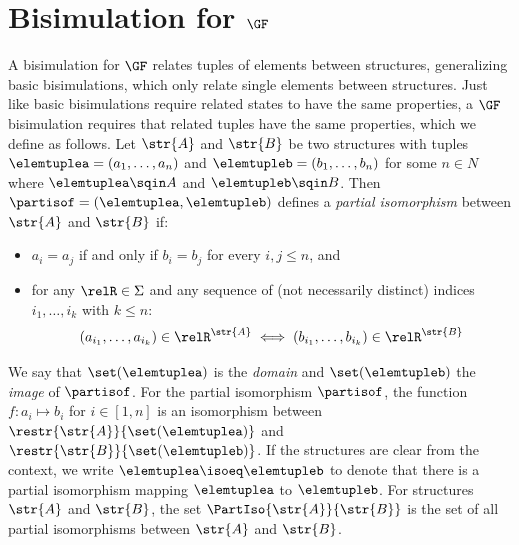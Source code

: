 \section{Bisimulation for $\GF$}
A bisimulation for $\GF$ relates tuples of elements between structures, generalizing basic bisimulations, which only relate single elements between structures.
Just like basic bisimulations require related states to have the same properties, a $\GF$ bisimulation requires that related tuples have the same properties, which we define as follows.
Let $\str{A}$ and $\str{B}$ be two structures with tuples $\elemtuplea = (a_{1}, \ldots, a_{n})$ and $\elemtupleb = (b_{1}, \ldots, b_{n})$ for some $n \in N$ where $\elemtuplea \sqin A$ and $\elemtupleb \sqin B$.
Then $\partisof = (\elemtuplea, \elemtupleb)$ defines a \emph{partial isomorphism} between $\str{A}$ and $\str{B}$ if:
\begin{itemize}
  \item $a_{i} = a_{j}$ if and only if $b_{i} = b_{j}$ for every $i,j \le n$, and
  \item for any $\relR \in \Sigma$ and any sequence of (not necessarily distinct) indices $i_{1}, \ldots, i_{k}$ with $k \le n$:
    \begin{equation*}
    (a_{i_{1}}, \ldots, a_{i_{k}}) \in \relR^{\str{A}} \iff (b_{i_{1}}, \ldots, b_{i_{k}}) \in \relR^{\str{B}}
    \end{equation*}
\end{itemize}
We say that $\set(\elemtuplea)$ is the \emph{domain} and $\set(\elemtupleb)$ the \emph{image} of $\partisof$.
For the partial isomorphism $\partisof$, the function $f \colon a_{i} \mapsto b_{i}$ for $i \in [1,n]$ is an isomorphism between $\restr{\str{A}}{\set(\elemtuplea)}$ and $\restr{\str{B}}{\set(\elemtupleb)}$.
If the structures are clear from the context, we write $\elemtuplea \isoeq \elemtupleb$ to denote that there is a partial isomorphism mapping $\elemtuplea$ to $\elemtupleb$.
For structures $\str{A}$ and $\str{B}$, the set $\PartIso{\str{A}}{\str{B}}$ is the set of all partial isomorphisms between $\str{A}$ and $\str{B}$.

